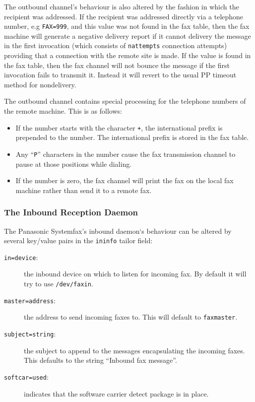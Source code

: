 The outbound channel's behaviour is also altered by the 
fashion in which the recipient was addressed.
If the recipient was addressed directly via a telephone number, e.g
\verb+FAX=999+, and this value was not found in the fax table, then the
fax machine will generate a negative delivery report if it cannot
delivery the message in the first invocation (which consists of
\verb+nattempts+ connection attempts) providing that a connection with
the remote site is made.
If the value is found in the fax table, then the fax channel will not
bounce the message if the first invocation fails to transmit it.
Instead it will revert to the usual PP timeout method for nondelivery.

The outbound channel contains special processing for the telephone
numbers of the remote machine. This is as follows:
\begin{itemize}

\item If the number starts with the character \verb-+-, the international
prefix is prepended to the number.
The international prefix is stored in the fax table.

\item Any ``\verb+P+'' characters in the number cause the fax transmission
channel to pause at those positions while dialing.

\item If the number is zero, the fax channel will print the fax on the local
fax machine rather than send it to a remote fax.

\end{itemize}

\subsubsection {The Inbound Reception Daemon}

The Panasonic Systemfax's inbound daemon`s behaviour can be altered by
several key/value pairs in the \verb+ininfo+ tailor field:
\begin{description}
\item[\verb+in=device+:] the inbound device on which to listen for
incoming fax. By default it will try to use \verb+/dev/faxin+.

\item[\verb+master=address+:] the address to send incoming faxes to.
This will default to \verb+faxmaster+.

\item[\verb+subject=string+:] the subject to append to the messages
encapsulating the incoming faxes. This defaults to the string
``Inbound fax message''.

\item[\verb+softcar=used+:] indicates that the software carrier detect
package is in place.
\end{description}

